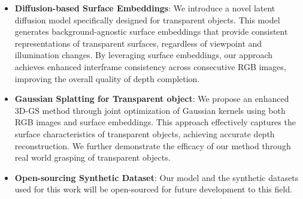 \begin{itemize}
    \item \textbf{Diffusion-based Surface Embeddings}: We introduce a novel latent diffusion model specifically designed for transparent objects. This model generates background-agnostic surface embeddings that provide consistent representations of transparent surfaces, regardless of viewpoint and illumination changes. By leveraging surface embeddings, our approach achieves enhanced interframe consistency across consecutive RGB images, improving the overall quality of depth completion.
    \item \textbf{Gaussian Splatting for Transparent object}: We propose an enhanced \ac{3D-GS} method through joint optimization of Gaussian kernels using both RGB images and surface embeddings. This approach effectively captures the surface characteristics of transparent objects, achieving accurate depth reconstruction. We further demonstrate the efficacy of our method through real world grasping of transparent objects.     
    \item \textbf{Open-sourcing Synthetic Dataset}: Our model and the synthetic datasets used for this work will be open-sourced for future development to this field. 
    
\end{itemize}


 





















